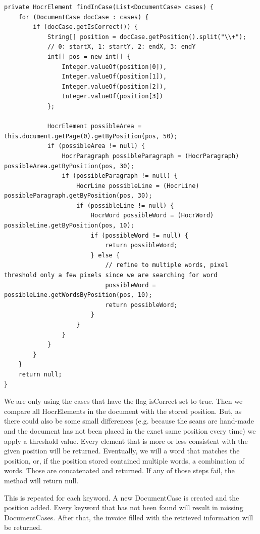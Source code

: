 \begin{lstlisting}[caption={Search for information in the DocumentCase}]
private HocrElement findInCase(List<DocumentCase> cases) {
    for (DocumentCase docCase : cases) {
        if (docCase.getIsCorrect()) {
            String[] position = docCase.getPosition().split("\\+");
            // 0: startX, 1: startY, 2: endX, 3: endY
            int[] pos = new int[] {
				Integer.valueOf(position[0]), 
				Integer.valueOf(position[1]), 
				Integer.valueOf(position[2]), 
				Integer.valueOf(position[3])
			};

            HocrElement possibleArea = this.document.getPage(0).getByPosition(pos, 50);
            if (possibleArea != null) {
                HocrParagraph possibleParagraph = (HocrParagraph)  possibleArea.getByPosition(pos, 30);
                if (possibleParagraph != null) {
                    HocrLine possibleLine = (HocrLine) possibleParagraph.getByPosition(pos, 30);
                    if (possibleLine != null) {
                        HocrWord possibleWord = (HocrWord) possibleLine.getByPosition(pos, 10);
                        if (possibleWord != null) {
                            return possibleWord;
                        } else {
                            // refine to multiple words, pixel threshold only a few pixels since we are searching for word
                            possibleWord = possibleLine.getWordsByPosition(pos, 10);
                            return possibleWord;
                        }
                    }
                }
            }
        }
    }
    return null;
}
\end{lstlisting}

We are only using the cases that have the flag isCorrect set to true. Then we compare all HocrElements in the document with the stored position. But, as there could also be some small differences (e.g. because the scans are hand-made and the document has not been placed in the exact same position every time) we apply a threshold value. Every element that is more or less consistent with the given position will be returned. Eventually, we will a word that matches the position, or, if the position stored contained multiple words, a combination of words. Those are concatenated and returned. If any of those steps fail, the method will return null.

This is repeated for each keyword. A new DocumentCase is created and the position added. Every keyword that has not been found will result in missing DocumentCases. After that, the invoice filled with the retrieved information will be returned.

